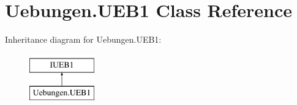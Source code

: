 \hypertarget{class_uebungen_1_1_u_e_b1}{}\section{Uebungen.\+U\+E\+B1 Class Reference}
\label{class_uebungen_1_1_u_e_b1}
Inheritance diagram for Uebungen.\+U\+E\+B1\+:\begin{figure}[H]
\begin{center}
\leavevmode
\includegraphics[height=2.000000cm]{class_uebungen_1_1_u_e_b1}
\end{center}
\end{figure}
